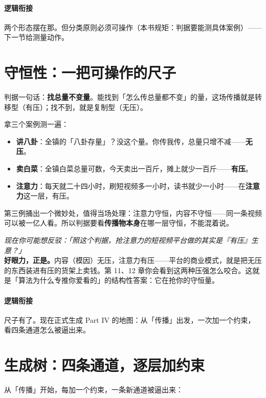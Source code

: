\documentclass[../../main2.tex]{subfiles}
\begin{document}
\paragraph*{逻辑衔接}
	两个形态摆在那。但分类原则必须可操作（本书规矩：判据要能测具体案例）——下一节给测量动作。

\section{守恒性：一把可操作的尺子}

判据一句话：\textbf{找总量不变量}。能找到「怎么传总量都不变」的量，这场传播就是转移型（有压）；找不到，就是复制型（无压）。

拿三个案例测一遍：

\begin{itemize}
	\item \textbf{讲八卦}：全镇的「八卦存量」？没这个量。你传我传，总量只增不减——\textbf{无压}。
	\item \textbf{卖白菜}：全镇白菜总量可数，今天卖出一百斤，摊上就少一百斤——\textbf{有压}。
	\item \textbf{注意力}：每天就二十四小时，刷短视频多一小时，读书就少一小时——在\textbf{注意力}这一层，有压。
\end{itemize}

第三例捅出一个微妙处，值得当场处理：注意力守恒，内容不守恒——同一条视频可以被一亿人看。所以判据要看\textbf{传播物本身}在哪一层守恒，不能混着说。

\begin{questionbox}
	\textit{现在你可能想反驳：「照这个判据，抢注意力的短视频平台做的其实是『有压』生意？」}\\
	\textbf{好眼力，正是。}内容（模因）无压，注意力有压——平台的商业模式，就是把无压的东西装进有压的货架上卖钱。第 11、12 章你会看到这两种压强怎么咬合。这就是「算法为什么专推你爱看的」的结构性答案：它在抢你的守恒量。
\end{questionbox}

\paragraph*{逻辑衔接}
	尺子有了。现在正式生成 Part IV 的地图：从「传播」出发，一次加一个约束，看四条通道怎么被逼出来。

\section{生成树：四条通道，逐层加约束}

从「传播」开始，每加一个约束，一条新通道被逼出来：
\end{document}
